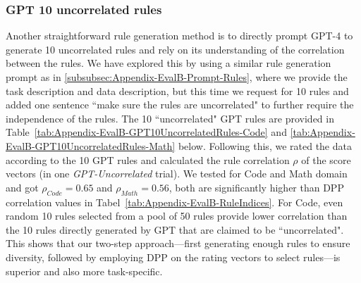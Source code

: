 \documentclass{article}
\begin{document}
\subsubsection{GPT 10 uncorrelated rules}
Another straightforward rule generation method is to directly prompt GPT-4 to generate 10 uncorrelated rules and rely on its understanding of the correlation between the rules. We have explored this by using a similar rule generation prompt as in \ref{subsubsec:Appendix-EvalB-Prompt-Rules}, where we provide the task description and data description, but this time we request for 10 rules and added one sentence ``make sure the rules are uncorrelated" to further require the independence of the rules. The 10 ``uncorrelated" GPT rules are provided in Table~\ref{tab:Appendix-EvalB-GPT10UncorrelatedRules-Code} and \ref{tab:Appendix-EvalB-GPT10UncorrelatedRules-Math}  below. Following this, we rated the data according to the 10 GPT rules and calculated the rule correlation $\rho$ of the score vectors (in one \textit{GPT-Uncorrelated} trial). We tested for Code and Math domain and got $\rho_{Code} = 0.65$ and $\rho_{Math}=0.56$, both are significantly higher than DPP correlation values in Tabel~\ref{tab:Appendix-EvalB-RuleIndices}. For Code, even random 10 rules selected from a pool of 50 rules provide lower correlation than the 10 rules directly generated by GPT that are claimed to be ``uncorrelated". This shows that our two-step approach---first generating enough rules to ensure diversity, followed by employing DPP on the rating vectors to select rules---is superior and also more task-specific.
\end{document}
